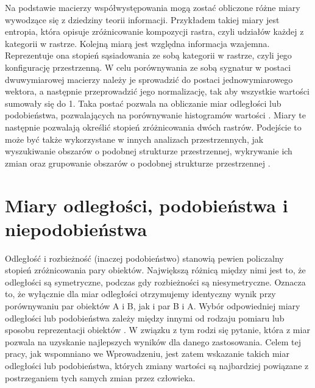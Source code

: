 \documentclass{amuthesis}
\begin{document}
Na podstawie macierzy współwystępowania mogą zostać obliczone różne
miary wywodzące się z dziedziny teorii informacji. Przykładem takiej
miary jest entropia, która opisuje zróżnicowanie kompozycji rastra,
czyli udziałów każdej z kategorii w rastrze. Kolejną miarą jest względna
informacja wzajemna. Reprezentuje ona stopień sąsiadowania ze sobą
kategorii w rastrze, czyli jego konfigurację przestrzenną. W celu
porównywania ze sobą sygnatur w postaci dwuwymiarowej macierzy należy je
sprowadzić do postaci jednowymiarowego wektora, a następnie
przeprowadzić jego normalizację, tak aby wszystkie wartości sumowały się
do 1. Taka postać pozwala na obliczanie miar odległości lub
podobieństwa, pozwalających na porównywanie histogramów wartości
\autocite{Cha2007}. Miary te następnie pozwalają określić stopień
zróżnicowania dwóch rastrów. Podejście to może być także wykorzystane w
innych analizach przestrzennych, jak wyszukiwanie obszarów o podobnej
strukturze przestrzennej, wykrywanie ich zmian oraz grupowanie obszarów
o podobnej strukturze przestrzennej \autocite{nowosad_motif}.

\hypertarget{miary-odlegux142oux15bci-podobieux144stwa-i-niepodobieux144stwa}{%
\section{Miary odległości, podobieństwa i
niepodobieństwa}\label{miary-odlegux142oux15bci-podobieux144stwa-i-niepodobieux144stwa}}

Odległość i rozbieżność (inaczej podobieństwo) stanowią pewien
policzalny stopień zróżnicowania pary obiektów. Największą różnicą
między nimi jest to, że odległości są symetryczne, podczas gdy
rozbieżności są niesymetryczne. Oznacza to, że wyłącznie dla miar
odległości otrzymujemy identyczny wynik przy porównywaniu par obiektów A
i B, jak i par B i A. Wybór odpowiedniej miary odległości lub
podobieństwa zależy między innymi od rodzaju pomiaru lub sposobu
reprezentacji obiektów \autocite{Cha2007}. W związku z tym rodzi się
pytanie, która z miar pozwala na uzyskanie najlepszych wyników dla
danego zastosowania. Celem tej pracy, jak wspomniano we Wprowadzeniu,
jest zatem wskazanie takich miar odległości lub podobieństwa, których
zmiany wartości są najbardziej powiązane z postrzeganiem tych samych
zmian przez człowieka.
\end{document}
